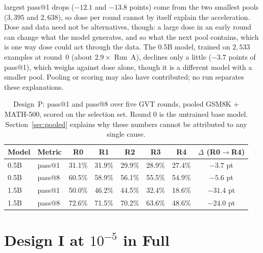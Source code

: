 \documentclass[runningheads]{llncs}
\begin{document}
largest pass@1 drops ($-12.1$ and $-13.8$ points) come from the two smallest
pools ($3{,}395$ and $2{,}638$), so dose per round cannot by itself explain
the acceleration. Dose and data need not be alternatives, though: a large
dose in an early round can change what the model generates, and so what the
next pool contains, which is one way dose could act through the data. The
0.5B model, trained on $2{,}533$ examples at round~0 (about $2.9\times$ Run~A),
declines only a little ($-3.7$ points of pass@1), which weighs against dose
alone, though it is a different model with a smaller pool. Pooling or scoring
may also have contributed; no run separates these explanations.
\begin{table}[!htb]
\caption{Design~P: pass@1 and pass@8 over five GVT rounds, pooled
GSM8K + MATH-500, scored on the selection set. Round 0 is the untrained
base model. Section~\ref{sec:pooled} explains why these numbers cannot
be attributed to any single cause.}
\label{tab:passk}
\centering
\begin{tabular}{llccccc c}
\toprule
Model & Metric & R0 & R1 & R2 & R3 & R4 & $\Delta$ (R0$\to$R4) \\
\midrule
0.5B & pass@1 & 31.1\% & 31.9\% & 29.9\% & 28.9\% & 27.4\% & $-3.7$ pt \\
0.5B & pass@8 & 60.5\% & 58.9\% & 56.1\% & 55.5\% & 54.9\% & $-5.6$ pt \\
1.5B & pass@1 & 50.0\% & 46.2\% & 44.5\% & 32.4\% & 18.6\% & $\mathbf{-31.4}$ pt \\
1.5B & pass@8 & 72.6\% & 71.5\% & 70.2\% & 63.6\% & 48.6\% & $\mathbf{-24.0}$ pt \\
\bottomrule
\end{tabular}
\end{table}

\section{Design I at $10^{-5}$ in Full}
\label{app:isolated}
\end{document}
